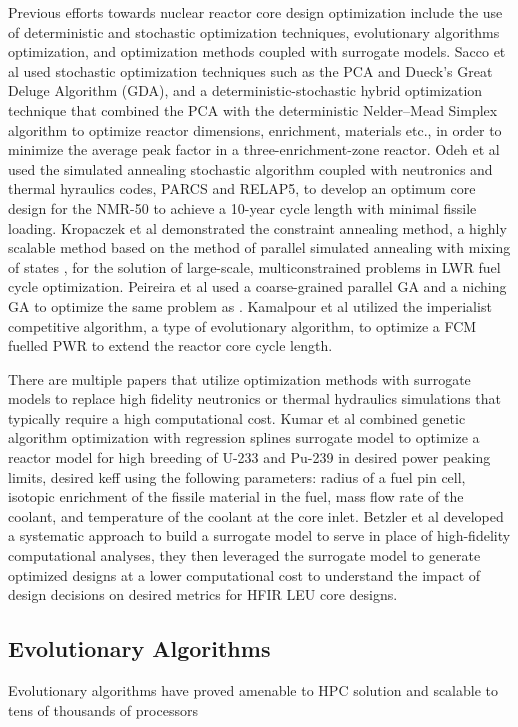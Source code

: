 Previous efforts towards nuclear reactor core design optimization include the use 
of deterministic and stochastic optimization techniques, evolutionary algorithms 
optimization, and optimization methods coupled with surrogate models. 
Sacco et al \cite{sacco_two_2006,sacco_metropolis_2008} used stochastic 
optimization techniques such as the \gls{PCA} and Dueck's Great Deluge 
Algorithm (GDA), and a deterministic-stochastic hybrid optimization technique
that combined the \gls{PCA} with the deterministic Nelder–Mead Simplex algorithm
to optimize reactor dimensions, enrichment, materials etc., 
in order to minimize the average peak factor in a three-enrichment-zone reactor. 
Odeh et al \cite{odeh_core_2016} used the simulated annealing stochastic algorithm 
coupled with neutronics and thermal hyraulics codes, \gls{PARCS} and RELAP5, 
to develop an optimum core design for the \gls{NMR-50} to achieve a 10-year cycle length 
with minimal fissile loading. 
Kropaczek et al \cite{kropaczek_large-scale_2019} demonstrated the constraint 
annealing method, a highly scalable method based on the method of parallel 
simulated annealing with mixing of states \cite{kropaczek_constraint_2019}, for 
the solution of large-scale, multiconstrained problems in \gls{LWR} fuel cycle 
optimization. 
Peireira et al \cite{pereira_coarse-grained_2003,pereira_parallel_2008} 
used a coarse-grained parallel \gls{GA} and a niching \gls{GA}
to optimize the same problem as \cite{sacco_two_2006}. 
Kamalpour et al \cite{kamalpour_smart_2020} utilized the imperialist competitive 
algorithm, a type of evolutionary algorithm, to optimize a \gls{FCM} fuelled 
\gls{PWR} to extend the reactor core cycle length. 

There are multiple papers that utilize optimization methods with surrogate models 
to replace high fidelity neutronics or thermal hydraulics simulations that 
typically require a high computational cost. 
Kumar et al \cite{kumar_new_2015} combined genetic algorithm optimization 
with regression splines surrogate model to optimize a reactor model for 
high breeding of U-233 and Pu-239 in desired power peaking limits, desired 
keff using the following parameters: radius of a fuel pin cell, isotopic enrichment 
of the fissile material in the fuel, mass flow rate of the coolant, and temperature 
of the coolant at the core inlet.
Betzler et al \cite{betzler_design_2019} developed a systematic approach to 
build a surrogate model to serve in place of high-fidelity computational 
analyses, they then leveraged the surrogate model to generate optimized designs 
at a lower computational cost to understand the impact of design decisions on 
desired metrics for \gls{HFIR} \gls{LEU} core designs. 

\subsection{Evolutionary Algorithms}
Evolutionary algorithms have proved amenable to \gls{HPC} solution and 
scalable to tens of thousands of processors \cite{kropaczek_constraint_2019}
